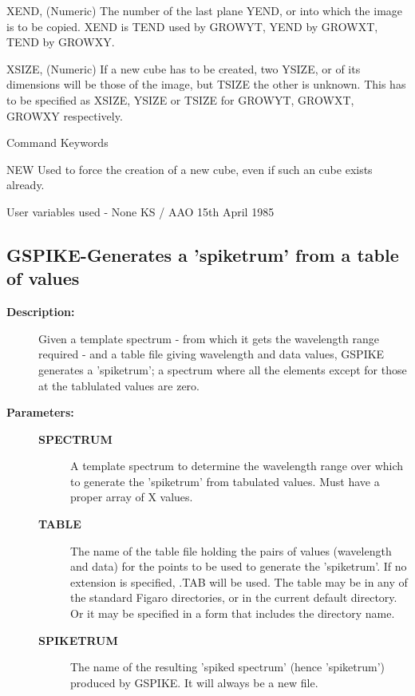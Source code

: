 \begin{description}
\begin{description}
\begin{terminalv}
 XEND,       (Numeric) The number of the last plane
 YEND, or    into which the image is to be copied.  XEND is
 TEND        used by GROWYT, YEND by GROWXT, TEND by GROWXY.

 XSIZE,      (Numeric) If a new cube has to be created, two
 YSIZE, or   of its dimensions will be those of the image, but
 TSIZE       the other is unknown.  This has to be specified as
             XSIZE, YSIZE or TSIZE for GROWYT, GROWXT, GROWXY
             respectively.

 Command Keywords

 NEW         Used to force the creation of a new cube, even if
             such an cube exists already.

 User variables used -  None
                                         KS / AAO 15th April 1985
\end{terminalv}
\end{description}
\subsection{GSPIKE-\label{GSPIKE}Generates a 'spiketrum' from a table of values}
\begin{description}

\item [\textbf{Description:}]
 Given a template spectrum - from which it gets the wavelength
 range required - and a table file giving wavelength and data
 values, GSPIKE generates a 'spiketrum'; a spectrum where all
 the elements except for those at the tablulated values are
 zero.

\item [\textbf{Parameters:}]
\begin{description}
\item [\textbf{SPECTRUM}]
 A template spectrum to determine the wavelength
 range over which to generate the 'spiketrum'
 from tabulated values.  Must have a proper
 array of X values.
\item [\textbf{TABLE}]
 The name of the table file holding the pairs of
 values (wavelength and data) for the points to be
 used to generate the 'spiketrum'.  If no extension
 is specified, .TAB will be used.  The table may be
 in any of the standard Figaro directories, or in the
 current default directory.  Or it may be specified
 in a form that includes the directory name.
\item [\textbf{SPIKETRUM}]
 The name of the resulting 'spiked spectrum'
 (hence 'spiketrum') produced by GSPIKE.  It
 will always be a new file.
\end{description}


\end{description}
\end{description}
